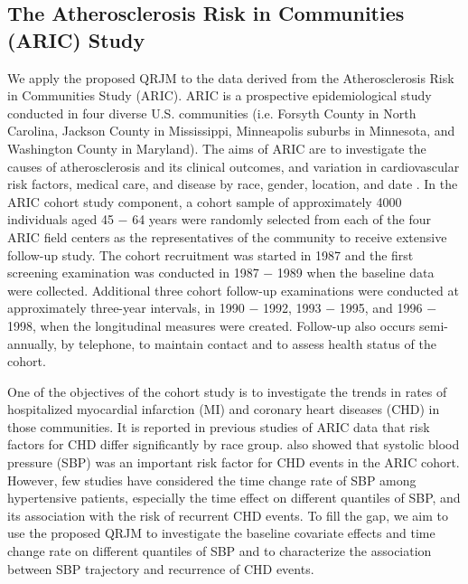 \subsection{The Atherosclerosis Risk in Communities (ARIC) Study}\label{sec:p2data_analysis}
We apply the proposed QRJM to the data derived from the Atherosclerosis Risk in Communities Study (ARIC). ARIC is a prospective epidemiological study conducted in four diverse U.S. communities (i.e. Forsyth County in North Carolina, Jackson County in Mississippi, Minneapolis suburbs in Minnesota, and Washington County in Maryland). The aims of ARIC are to investigate the causes of atherosclerosis and its clinical outcomes, and variation in cardiovascular risk factors, medical care, and disease by race, gender, location, and date \citep{aric1989atherosclerosis}. In the ARIC cohort study component, a cohort sample of approximately 4000 individuals aged 45 $-$ 64 years were randomly selected from each of the four ARIC field centers as the representatives of the community to receive extensive follow-up study. The cohort recruitment was started in 1987 and the first screening examination was conducted in 1987 $-$ 1989 when the baseline data were collected. Additional three cohort follow-up examinations were conducted at approximately three-year intervals, in 1990 $-$ 1992, 1993 $-$ 1995, and 1996 $-$ 1998, when the longitudinal measures were created. Follow-up also occurs semi-annually, by telephone, to maintain contact and to assess health status of the cohort.

One of the objectives of the cohort study is to investigate the trends in rates of hospitalized myocardial infarction (MI) and coronary heart diseases (CHD) in those communities. It is reported in previous studies of ARIC data that risk factors for CHD differ significantly by race group. \cite{wattanakit2005risk, rodriguez2014systolic} also showed that systolic blood pressure (SBP) was an important risk factor for CHD events in the ARIC cohort. However, few studies have considered the time change rate of SBP among hypertensive patients, especially the time effect on different quantiles of SBP, and its association with the risk of recurrent CHD events. To fill the gap, we aim to use the proposed QRJM to investigate the baseline covariate effects and time change rate on different quantiles of SBP and to characterize the association between SBP trajectory and recurrence of CHD events.


